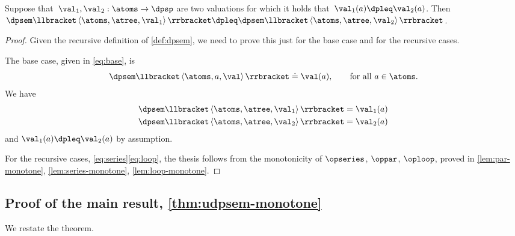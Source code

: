 \begin{lemma}
  \label{lem:dpsem-monotone}Suppose that~$\val_{1},\val_{2}:\atoms\rightarrow\dpsp$
  are two valuations for which it holds that~$\val_{1}(a)\dpleq\val_{2}(a)$.
  Then~$\dpsem\llbracket\left\langle \atoms,\atree,\val_{1}\right\rangle \rrbracket\dpleq\dpsem\llbracket\left\langle \atoms,\atree,\val_{2}\right\rangle \rrbracket$.
\end{lemma}
\begin{proof}
  Given the recursive definition of \cref{def:dpsem}, we need
  to prove this just for the base case and for the recursive cases.

  The base case, given in \cref{eq:base}, is
  \[
    \dpsem\llbracket\left\langle \atoms,a,\val\right\rangle \rrbracket\doteq\val(a),\qquad\text{for all}\ a\in\atoms.
  \]
  We have
  \begin{align*}
    \dpsem\llbracket\left\langle \atoms,\atree,\val_{1}\right\rangle \rrbracket & =\val_{1}(a)\\
    \dpsem\llbracket\left\langle \atoms,\atree,\val_{2}\right\rangle \rrbracket & =\val_{2}(a)
  \end{align*}
  and $\val_{1}(a)\dpleq\val_{2}(a)$ by assumption.

  For the recursive cases, \cref{eq:series}\textendash\ref{eq:loop},
  the thesis follows from the monotonicity of $\opseries$, $\oppar$,
  $\oploop$, proved in \cref{lem:par-monotone}, \cref{lem:series-monotone},
  \cref{lem:loop-monotone}.
\end{proof}

\subsection{Proof of the main result, \cref{thm:udpsem-monotone}}

\label{subsec:proof-main-result}

We restate the theorem.

